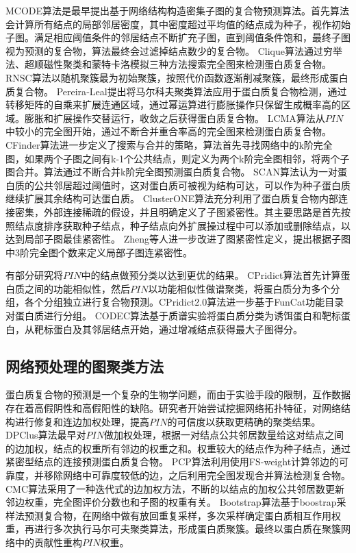 MCODE算法\cite{bader_automated_2003}是最早提出基于网络结构构造密集子图的复合物预测算法。首先算法会计算所有结点的局部邻居密度，其中密度超过平均值的结点成为种子，视作初始子图。满足相应阈值条件的邻居结点不断扩充子图，直到阈值条件饱和，最终子图视为预测的复合物，算法最终会过滤掉结点数少的复合物。
Clique算法\cite{spirin_protein_2003}通过穷举法、超顺磁性聚类和蒙特卡洛模拟三种方法搜索完全图来检测蛋白质复合物。
RNSC算法\cite{king_protein_2004}以随机聚簇最为初始聚簇，按照代价函数逐渐削减聚簇，最终形成蛋白质复合物。
Pereira‐Leal\cite{pereiraleal_detection_2004}提出将马尔科夫聚类算法应用于蛋白质复合物检测，通过转移矩阵的自乘来扩展连通区域，通过幂运算进行膨胀操作只保留生成概率高的区域。膨胀和扩展操作交替运行，收敛之后获得蛋白质复合物。
LCMA算法\cite{li_interaction_2005}从$PIN$中较小的完全图开始，通过不断合并重合率高的完全图来检测蛋白质复合物。CFinder算法\cite{adamcsek_cfinder_2006}进一步定义了搜索与合并的策略，算法首先寻找网络中的k阶完全图，如果两个子图之间有k-1个公共结点，则定义为两个k阶完全图相邻，将两个子图合并。算法通过不断合并k阶完全图预测蛋白质复合物。
SCAN算法\cite{mete_structural_2008}认为一对蛋白质的公共邻居超过阈值时，这对蛋白质可被视为结构可达，可以作为种子蛋白质继续扩展其余结构可达蛋白质。
ClusterONE算法\cite{nepusz_detecting_2012}充分利用了蛋白质复合物内部连接密集，外部连接稀疏的假设，并且明确定义了子图紧密性。其主要思路是首先按照结点度排序获取种子结点，种子结点向外扩展操过程中可以添加或删除结点，以达到局部子图最佳紧密性。
Zheng等人\cite{zheng_protein_2020}进一步改进了图紧密性定义，提出根据子图中3阶完全图个数来定义局部子图连紧密性。

有部分研究将$PIN$中的结点做预分类以达到更优的结果。
CPridict算法\cite{xu_function_2014}首先计算蛋白质之间的功能相似性，然后$PIN$以功能相似性做谱聚类，将蛋白质分为多个分组，各个分组独立进行复合物预测。CPridict2.0算法\cite{xu_effective_2017}进一步基于FunCat功能目录对蛋白质进行分组。
CODEC算法\cite{geva_identification_2011}基于质谱实验将蛋白质分类为诱饵蛋白和靶标蛋白，从靶标蛋白及其邻居结点开始，通过增减结点获得最大子图得分。

\subsection{网络预处理的图聚类方法}
\label{subsection:research:appendBiology}
蛋白质复合物的预测是一个复杂的生物学问题，而由于实验手段的限制，互作数据存在着高假阴性和高假阳性的缺陷\cite{von_mering_comparative_2002}。研究者开始尝试挖掘网络拓扑特征，对网络结构进行修复和连边加权处理，提高$PIN$的可信度以获取更精确的聚类结果。
DPClus算法\cite{altaf-ul-amin_development_2006}最早对$PIN$做加权处理，根据一对结点公共邻居数量给这对结点之间的边加权，结点的权重所有邻边的权重之和。权重较大的结点作为种子结点，通过紧密型结点的连接预测蛋白质复合物。
PCP算法\cite{chua_using_2008}利用使用FS-weight计算邻边的可靠度，并移除网络中可靠度较低的边，之后利用完全图发现合并算法检测复合物。
CMC算法\cite{liu_complex_2009}采用了一种迭代式的边加权方法，不断的以结点的加权公共邻居数更新邻边权重，完全图评价分数也和子图的权重有关。
Bootstrap算法\cite{friedel_bootstrapping_2009}基于boostrap采样法预测复合物，在网络中做有放回重复采样，多次采样确定蛋白质相互作用权重，再进行多次执行马尔可夫聚类算法，形成蛋白质聚簇。最终以蛋白质在聚簇网络中的贡献性重构$PIN$权重。

